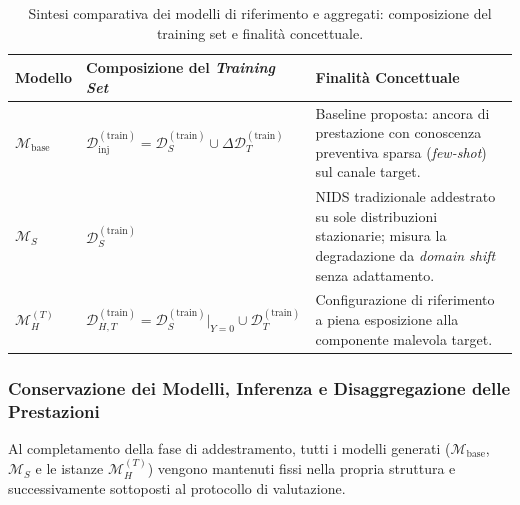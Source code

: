 \begin{table}[H]
    \centering
    \small
    \caption{Sintesi comparativa dei modelli di riferimento e aggregati: composizione del training set e finalità concettuale.}
    \label{tab:modelli_aggregati}
    \begin{tabularx}{\textwidth}{l l >{\raggedright\arraybackslash}X}
        \toprule
        \textbf{Modello} & \textbf{Composizione del \textit{Training Set}} & \textbf{Finalità Concettuale} \\
        \midrule
        $\mathcal{M}_{\text{base}}$ &
        $\mathcal{D}_{\text{inj}}^{(\text{train})} = \mathcal{D}_{S}^{(\text{train})} \cup \Delta \mathcal{D}_{T}^{(\text{train})}$ &
        Baseline proposta: ancora di prestazione con conoscenza preventiva sparsa (\textit{few-shot}) sul canale target. \\
        \addlinespace
        $\mathcal{M}_{S}$ &
        $\mathcal{D}_{S}^{(\text{train})}$ &
        NIDS tradizionale addestrato su sole distribuzioni stazionarie; misura la degradazione da \textit{domain shift} senza adattamento. \\
        \addlinespace
        $\mathcal{M}_{H}^{(T)}$ &
        $\mathcal{D}_{H,T}^{(\text{train})} = \mathcal{D}_{S}^{(\text{train})}\big|_{Y=0} \cup \mathcal{D}_{T}^{(\text{train})}$ &
        Configurazione di riferimento a piena esposizione alla componente malevola target. \\
        \bottomrule
    \end{tabularx}
\end{table}

\subsubsection{Conservazione dei Modelli, Inferenza e Disaggregazione delle Prestazioni}
\label{subsubsec:persistenza_aggregati}
Al completamento della fase di addestramento, tutti i modelli generati ($\mathcal{M}_{\text{base}}$, $\mathcal{M}_{S}$ e le istanze $\mathcal{M}_{H}^{(T)}$) vengono mantenuti fissi nella propria struttura e successivamente sottoposti al protocollo di valutazione.

